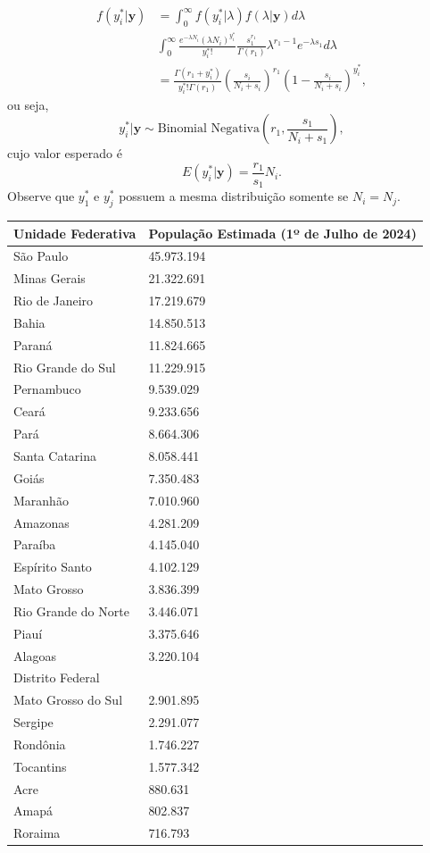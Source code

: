 \documentclass[
  letterpaper,
  DIV=11,
  numbers=noendperiod]{scrreprt}
\theoremstyle{plain}
\theoremstyle{definition}
\theoremstyle{definition}
\theoremstyle{remark}
\begin{document}
\[\begin{align}
f(y^*_i|\boldsymbol{y})&=\int_0^\infty f(y^*_i|\lambda)f(\lambda|\boldsymbol{y})d\lambda\\
&\int_0^\infty \frac{e^{-\lambda N_i}(\lambda N_i)^{y_i^*}}{y_i^*!}\frac{s_1^{r_1}}{\Gamma(r_1)}\lambda^{r_1-1}e^{-\lambda s_1}d\lambda\\
&=\frac{\Gamma(r_1+y_i^*)}{y_i^*!\Gamma(r_1)}\left(\frac{s_i}{N_i+s_i}\right)^{r_1}\left(1-\frac{s_i}{N_i+s_i}\right)^{y_i^*},
\end{align}\] ou seja,
\[y_i^*|\boldsymbol{y}\sim\text{Binomial Negativa}\left(r_1,\frac{s_1}{N_i+s_1}\right),\]
cujo valor esperado é \[E(y_i^*|\boldsymbol{y})=\frac{r_1}{s_1}N_i.\]
Observe que \(y_1^*\) e \(y_j^*\) possuem a mesma distribuição somente
se \(N_i=N_j\).

\label{exm}
\begin{longtable}[]{@{}ll@{}}
\toprule\noalign{}
Unidade Federativa & População Estimada (1º de Julho de 2024) \\
\midrule\noalign{}
\endhead
\bottomrule\noalign{}
\endlastfoot
São Paulo & 45.973.194 \\
Minas Gerais & 21.322.691 \\
Rio de Janeiro & 17.219.679 \\
Bahia & 14.850.513 \\
Paraná & 11.824.665 \\
Rio Grande do Sul & 11.229.915 \\
Pernambuco & 9.539.029 \\
Ceará & 9.233.656 \\
Pará & 8.664.306 \\
Santa Catarina & 8.058.441 \\
Goiás & 7.350.483 \\
Maranhão & 7.010.960 \\
Amazonas & 4.281.209 \\
Paraíba & 4.145.040 \\
Espírito Santo & 4.102.129 \\
Mato Grosso & 3.836.399 \\
Rio Grande do Norte & 3.446.071 \\
Piauí & 3.375.646 \\
Alagoas & 3.220.104 \\
Distrito Federal & \\
Mato Grosso do Sul & 2.901.895 \\
Sergipe & 2.291.077 \\
Rondônia & 1.746.227 \\
Tocantins & 1.577.342 \\
Acre & 880.631 \\
Amapá & 802.837 \\
Roraima & 716.793 \\
\end{longtable}
\end{document}

